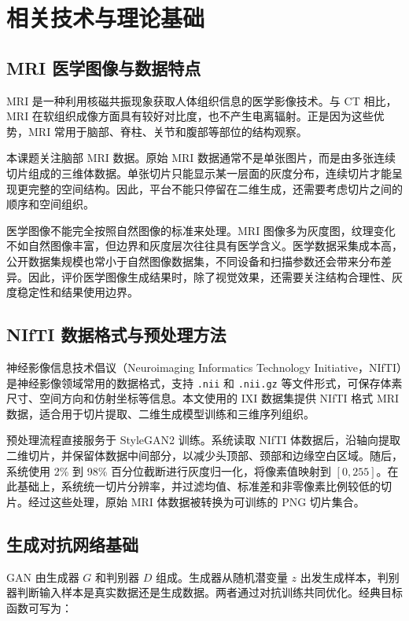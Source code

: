 \chapter{相关技术与理论基础}

\section{MRI 医学图像与数据特点}
MRI 是一种利用核磁共振现象获取人体组织信息的医学影像技术。与 CT 相比，MRI 在软组织成像方面具有较好对比度，也不产生电离辐射。正是因为这些优势，MRI 常用于脑部、脊柱、关节和腹部等部位的结构观察。

本课题关注脑部 MRI 数据。原始 MRI 数据通常不是单张图片，而是由多张连续切片组成的三维体数据。单张切片只能显示某一层面的灰度分布，连续切片才能呈现更完整的空间结构。因此，平台不能只停留在二维生成，还需要考虑切片之间的顺序和空间组织。

医学图像不能完全按照自然图像的标准来处理。MRI 图像多为灰度图，纹理变化不如自然图像丰富，但边界和灰度层次往往具有医学含义。医学数据采集成本高，公开数据集规模也常小于自然图像数据集，不同设备和扫描参数还会带来分布差异。因此，评价医学图像生成结果时，除了视觉效果，还需要关注结构合理性、灰度稳定性和结果使用边界。

\section{NIfTI 数据格式与预处理方法}
神经影像信息技术倡议（Neuroimaging Informatics Technology Initiative，NIfTI）是神经影像领域常用的数据格式，支持 \texttt{.nii} 和 \texttt{.nii.gz} 等文件形式，可保存体素尺寸、空间方向和仿射坐标等信息\cite{nifti2004}。本文使用的 IXI 数据集提供 NIfTI 格式 MRI 数据，适合用于切片提取、二维生成模型训练和三维序列组织\cite{ixiDataset}。

预处理流程直接服务于 StyleGAN2 训练。系统读取 NIfTI 体数据后，沿轴向提取二维切片，并保留体数据中间部分，以减少头顶部、颈部和边缘空白区域。随后，系统使用 2\% 到 98\% 百分位截断进行灰度归一化，将像素值映射到 $[0,255]$。在此基础上，系统统一切片分辨率，并过滤均值、标准差和非零像素比例较低的切片。经过这些处理，原始 MRI 体数据被转换为可训练的 PNG 切片集合。

\section{生成对抗网络基础}
GAN 由生成器 $G$ 和判别器 $D$ 组成。生成器从随机潜变量 $z$ 出发生成样本，判别器判断输入样本是真实数据还是生成数据。两者通过对抗训练共同优化。经典目标函数可写为：

